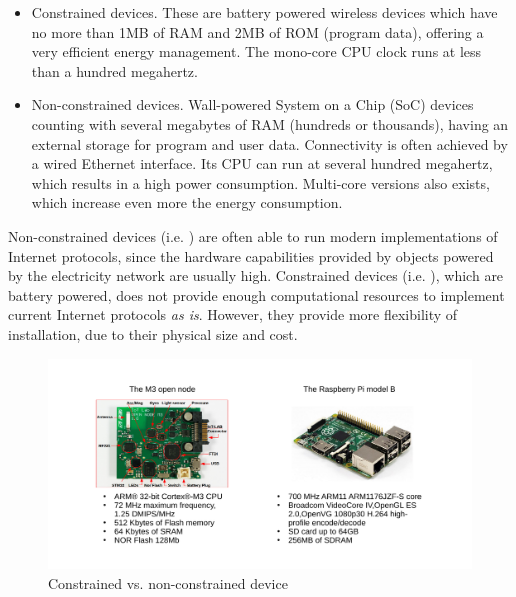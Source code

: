 \begin{itemize}
	\item Constrained devices. These are battery powered wireless devices which have no more than 1MB of RAM and 2MB of ROM (program data), offering a very efficient energy management. The mono-core CPU clock runs at less than a hundred megahertz.
	\item Non-constrained devices. Wall-powered System on a Chip (SoC) devices counting with several megabytes of RAM (hundreds or thousands), having an external storage for program and user data. Connectivity is often achieved by a wired Ethernet interface. Its CPU can run at several hundred megahertz, which results in a high power consumption. Multi-core versions also exists, which increase even more the energy consumption.
\end{itemize}

Non-constrained devices (i.e. \cite{RPi}) are often able to run modern implementations of Internet protocols, since the hardware capabilities provided by objects powered by the electricity network are usually high.
Constrained devices (i.e. \cite{iotlab-m3}), which are battery powered, does not provide enough computational resources to implement current Internet protocols \textit{as is}.
However, they provide more flexibility of installation, due to their physical size and cost.


\begin{figure}[htb]
	\centering
	\includegraphics[width=1\columnwidth]{chapters/background.images/BoardsComparison.pdf}
	\caption{Constrained vs. non-constrained device}
	\label{fig:BoardsComparison}
\end{figure}

